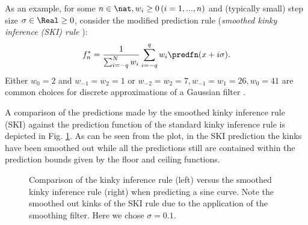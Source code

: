 As an example, for some $n \in \nat, w_i \geq 0 \, (i=1,...,n)$ and (typically small) step size $\sigma \in \Real \geq 0$, consider the modified prediction rule (\textit{smoothed kinky inference (SKI) rule} ):
%
\begin{equation}
f_n^* = \frac{1}{\sum_{i=-q}^N w_i} 
\sum_{i=-q}^q w_i \predfn (x+i \sigma) .
\end{equation}
%
Either $w_0 = 2$ and $w_{-1}=w_2 =1$ or $w_{-2} = w_2 = 7, w_{-1}=w_1 = 26, w_0 = 41$  are common choices for discrete approximations of a Gaussian filter \cite{Baessmann2004}. 

A comparison of the predictions made by the {smoothed kinky inference rule (SKI) } against the prediction function of the standard kinky inference rule is depicted in Fig. \ref{fig:exSKI1}. As can be seen from the plot, in the SKI prediction the kinks have been smoothed out while all the predictions still are contained within the prediction bounds given by the floor and ceiling functions.

\begin{figure}
        \centering
	\label{fig:exSKI1}
   \caption{Comparison of the kinky inference rule (left) versus the smoothed kinky inference rule (right) when predicting a sine curve. Note the smoothed out kinks of the SKI rule due to the application of the smoothing filter. Here we chose $\sigma =0.1$. }
\end{figure}	  

